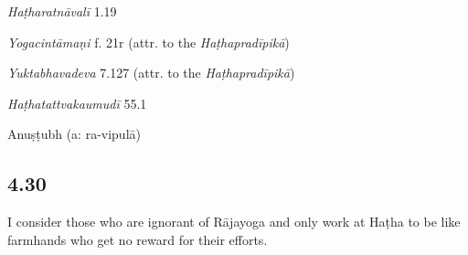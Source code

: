 \begin{ekdosis}
\begin{testimonia}[hp04_029]
\emph{Haṭharatnāvalī} 1.19
\begin{versinnote}
\end{versinnote}

\emph{Yogacintāmaṇi} f. 21r (attr. to the \emph{Haṭhapradīpikā})
\begin{versinnote}
\end{versinnote}

\emph{Yuktabhavadeva} 7.127 (attr. to the \emph{Haṭhapradīpikā})
\begin{versinnote}
\end{versinnote}

\emph{Haṭhatattvakaumudī} 55.1
\begin{versinnote}
\end{versinnote}
\end{testimonia}


\begin{metre}[hp04_029]
Anuṣṭubh (a: ra-vipulā)
\end{metre}

\subsection*{4.30}
\begin{translation}[hp04_030]
I consider those who are ignorant of Rājayoga and only work at Haṭha to be like farmhands who get no reward for their efforts.%
\end{translation}



\end{ekdosis}
